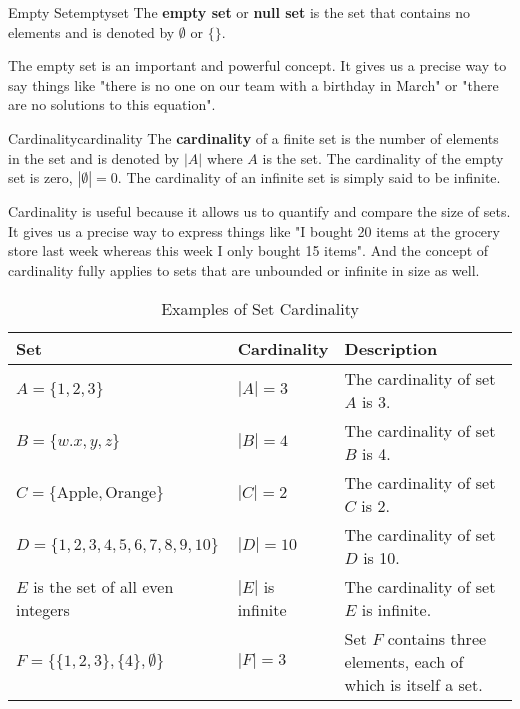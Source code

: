 \begin{definition}{Empty Set}{emptyset}
  The \textbf{empty set} or \textbf{null set} is the set that contains no elements
  and is denoted by \( \emptyset \) or \( \{ \} \).
\end{definition}

The empty set is an important and powerful concept. It gives us a precise way to say
things like "there is no one on our team with a birthday in March" or "there are no
solutions to this equation".

\begin{definition}{Cardinality}{cardinality}
  The \textbf{cardinality} of a finite set is the number of elements in the set and is
  denoted by \( |A| \) where \( A \) is the set. The cardinality of the empty
  set is zero, \( |\emptyset| = 0 \). The cardinality of an infinite set is simply said
  to be infinite.
\end{definition}

Cardinality is useful because it allows us to quantify and compare the size of sets. It
gives us a precise way to express things like "I bought 20 items at the grocery store
last week whereas this week I only bought 15 items". And the concept of cardinality
fully applies to sets that are unbounded or infinite in size as well.

\begin{table}[H]
  \centering
  \begin{tabular}{p{2in} p{1in} p{2in}}
    \toprule
    \textbf{Set} & \textbf{Cardinality} & \textbf{Description} \\
    \midrule
    \( A = \{ 1, 2, 3 \} \) & \( |A| = 3 \) & The cardinality of set \(A\) is 3. \\
    \( B = \{ w. x, y, z \} \) & \( |B| = 4 \) & The cardinality of set \(B\) is 4. \\
    \( C = \{ \text{Apple}, \text{Orange} \} \) & \( |C| = 2 \) & The cardinality of set \(C\) is 2. \\
    \( D = \{ 1, 2, 3, 4, 5, 6, 7, 8, 9, 10 \} \) & \( |D| = 10 \) & The cardinality of set \(D\) is 10. \\
    \( E \) is the set of all even integers & \( |E| \) is infinite & The cardinality of set \(E\) is infinite. \\
    \( F = \{ \{1, 2, 3\}, \{4\}, \emptyset \} \) & \( |F| = 3 \) & Set \(F\) contains three elements, each of which is itself a set. \\
    \bottomrule
  \end{tabular}
  \caption{Examples of Set Cardinality}
\end{table}

